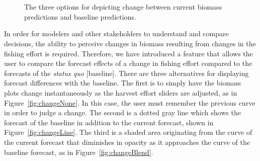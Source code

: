 \begin{figure}
\centering

 \\ 

 \\ 


	\caption{The three options for depicting change between current biomass predictions and baseline predictions.}
	\label{fig:changeTypes}
\end{figure}

In order for modelers and other stakeholders to understand and compare decisions, the ability to perceive changes in biomass resulting from changes in the fishing effort is required.  Therefore, we have introduced a feature that allows the user to compare the forecast effects of a change in fishing effort compared to the forecasts of the \textit{status quo} [baseline]. There are three alternatives for displaying forecast differences with the baseline.  The first is to simply have the biomass plots change instantaneously as the harvest effort sliders are adjusted, as in Figure~\ref{fig:changeNone}.  In this case, the user must remember the previous curve in order to judge a change.  The second is a dotted gray line which shows the forecast of the baseline in addition to the current forecast, shown in Figure~\ref{fig:changeLine}.  The third is a shaded area originating from the curve of the current forecast that diminishes in opacity as it approaches the curve of the baseline forecast, as in Figure~\ref{fig:changeBlend}.

